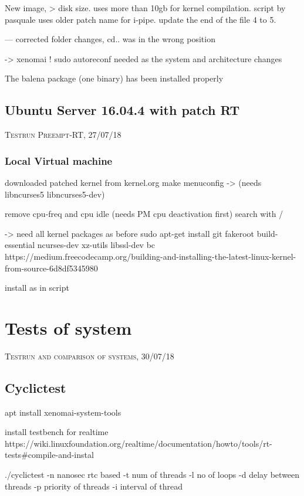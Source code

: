 \documentclass[]{scrartcl}
\begin{document}
New image, > disk size. uses more than 10gb for kernel compilation. script by pasquale uses older patch name for i-pipe. update the end of the file 4 to 5.

--- corrected folder changes, cd.. was in the wrong position

-> xenomai ! sudo autoreconf
needed as the system and architecture changes

The balena package (one binary) has been installed properly


\subsection{Ubuntu Server 16.04.4 with patch RT}

{\small\textsc{Testrun Preempt-RT, 27/07/18} \bigskip}


\subsubsection{Local Virtual machine}

downloaded patched kernel from kernel.org
make menuconfig
-> (needs libncurses5 libncurses5-dev)

remove cpu-freq and cpu idle (needs PM cpu deactivation first)
search with /

-> need all kernel packages as before
sudo apt-get install git fakeroot build-essential ncurses-dev xz-utils libssl-dev bc
https://medium.freecodecamp.org/building-and-installing-the-latest-linux-kernel-from-source-6d8df5345980

install as in script

\section{Tests of system}

{\small\textsc{Testrun and comparison of systems, 30/07/18} \bigskip}

\subsection{Cyclictest}

apt install xenomai-system-tools

install testbench for realtime
https://wiki.linuxfoundation.org/realtime/documentation/howto/tools/rt-tests#compile-and-instal



./cyclictest 
-n nanosec rtc based
-t num of threads
-l no of loops
-d delay between threads
-p priority of threads
-i interval of thread
\end{document}
